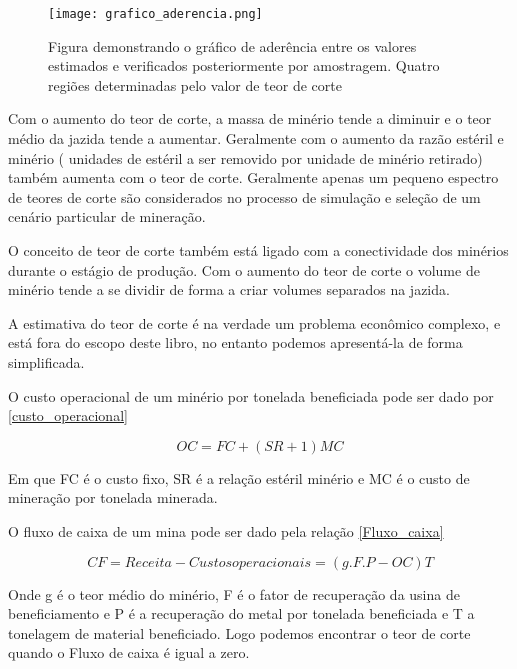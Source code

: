  	\begin{figure}[H]
 		\centering
 		\texttt{[image: grafico\_aderencia.png]}	
 		\caption{Figura demonstrando o gráfico de aderência entre os valores estimados e verificados posteriormente por amostragem. Quatro regiões determinadas pelo valor de teor de corte }
 		\label{Grafico_validacao}
 	\end{figure}
 	
     Com o aumento do teor de corte, a massa de minério tende a diminuir e o teor médio da jazida tende a aumentar. Geralmente com o aumento da razão estéril e minério ( unidades de estéril a ser removido por unidade de minério retirado) também aumenta com o teor de corte. Geralmente apenas um pequeno espectro de teores de corte são considerados no processo de simulação e seleção de um cenário particular de mineração. 
     
     O conceito de teor de corte também está ligado com a conectividade dos minérios durante o estágio de produção. Com o aumento do teor de corte o volume de minério tende a se dividir de forma a criar volumes separados na jazida. 
     
     A estimativa do teor de corte é na verdade um problema econômico complexo, e está fora do escopo deste libro, no entanto podemos apresentá-la de forma simplificada. 
     
     O custo operacional de um minério por tonelada beneficiada pode ser dado por \eqref{custo_operacional}
     
     \begin{equation}\label{custo_operacional}
     OC = FC + (SR +1 )MC
     \end{equation}
     
     Em que FC é o custo fixo, SR é a relação estéril minério e MC é o custo de mineração por tonelada minerada. 
     
     O fluxo de caixa de um mina pode ser dado pela relação \eqref{Fluxo_caixa}
     
     \begin{equation}\label{Fluxo_caixa}
     CF = Receita - Custos operacionais = (g.F.P-OC)T
     \end{equation}
     
     Onde g é o teor médio do minério, F é o fator de recuperação da usina de beneficiamento e P é a recuperação do metal por tonelada beneficiada e T a tonelagem de material beneficiado. Logo podemos encontrar o teor de corte quando o Fluxo de caixa é igual a zero. 
     
